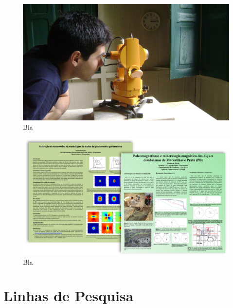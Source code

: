 \documentclass[11pt,a4paper,oneside]{book}
\begin{document}
\begin{figure}[h]
  \vspace{0.5cm}
  \begin{center}
    \includegraphics[width=\textwidth]{images/vassouras-geomag-observation-2012.jpg}
  \end{center}
  \caption{
    Bla
  }
\end{figure}

\begin{figure}[h]
  \vspace{0.5cm}
  \begin{center}
    \includegraphics[width=\textwidth]{images/posters-iag.png}
  \end{center}
  \caption{
    Bla
  }
\end{figure}

\chapter{Linhas de Pesquisa}
\end{document}
